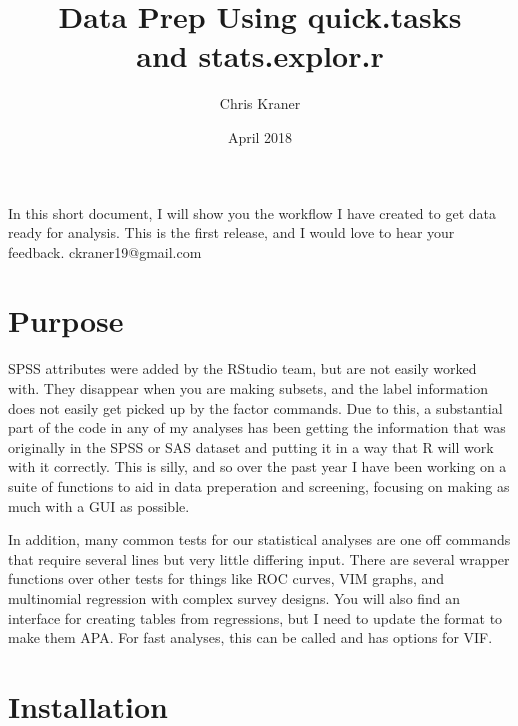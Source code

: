 \documentclass{article}
\title{Data Prep Using quick.tasks \\ and stats.explor.r}
\author{Chris Kraner}
\date{April 2018}
\begin{document}
\maketitle

\newpage

In this short document, I will show you the workflow I have created to get data ready for analysis. This is the first release, and I would love to hear your feedback. ckraner19@gmail.com

\section{Purpose}
SPSS attributes were added by the RStudio team, but are not easily worked with. They disappear when you are making subsets, and the label information does not easily get picked up by the factor commands. Due to this, a substantial part of the code in any of my analyses has been getting the information that was originally in the SPSS or SAS dataset and putting it in a way that R will work with it correctly. This is silly, and so over the past year I have been working on a suite of functions to aid in data preperation and screening, focusing on making as much with a GUI as possible.

In addition, many common tests for our statistical analyses are one off commands that require several lines but very little differing input. There are several wrapper functions over other tests for things like ROC curves, VIM graphs, and multinomial regression with complex survey designs. You will also find an interface for creating tables from regressions, but I need to update the format to make them APA. For fast analyses, this can be called and has options for VIF.

\section{Installation}
\end{document}
